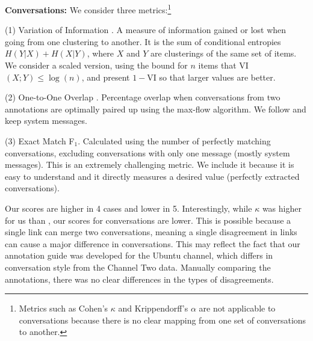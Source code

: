 \documentclass[11pt,a4paper]{article}
\newcommand{\tightparagraph}[1]{\noindent\textbf{#1:}}
\begin{document}
\tightparagraph{Conversations}
We consider three metrics:\footnote{
  Metrics such as Cohen's $\kappa$ and Krippendorff's $\alpha$ are not applicable to conversations because there is no clear mapping from one set of conversations to another.
}

(1) Variation of Information \citep[VI,][]{Meila:2007}.
A measure of information gained or lost when going from one clustering to another.
It is the sum of conditional entropies $H(Y | X) + H(X | Y)$, where $X$ and $Y$ are clusterings of the same set of items.
We consider a scaled version, using the bound for $n$ items that VI$(X ; Y) \le \log(n)$, and present $1 - $VI so that larger values are better.

(2) One-to-One Overlap \citep[1-1,][]{elsner:2008}.
Percentage overlap when conversations from two annotations are optimally paired up using the max-flow algorithm.
We follow \citet{Mehri:2017:IJCNLP} and keep system messages.

(3) Exact Match F$_1$.
Calculated using the number of perfectly matching conversations, excluding conversations with only one message (mostly system messages).
This is an extremely challenging metric.
We include it because it is easy to understand and it directly measures a desired value (perfectly extracted conversations).

Our scores are higher in 4 cases and lower in 5.
Interestingly, while $\kappa$ was higher for us than \citet{Mehri:2017:IJCNLP}, our scores for conversations are lower.
This is possible because a single link can merge two conversations, meaning a single disagreement in links can cause a major difference in conversations.
This may reflect the fact that our annotation guide was developed for the Ubuntu channel, which differs in conversation style from the Channel Two data.
Manually comparing the annotations, there was no clear differences in the types of disagreements.
\end{document}
